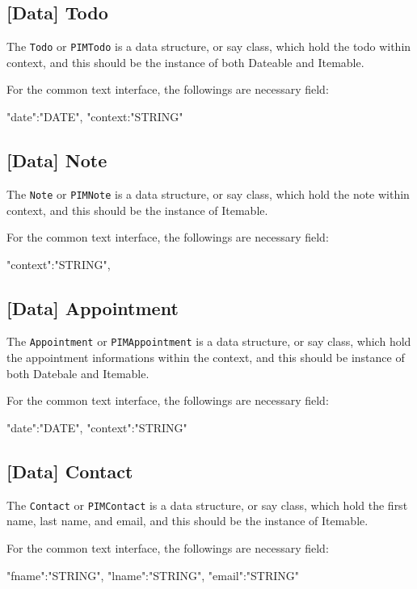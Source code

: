 \documentclass{article}
\begin{document}
    \subsection{[Data] Todo}
    The \lstinline|Todo| or \lstinline|PIMTodo| is a data structure, or say class, which hold the todo within context,
    and this should be the instance of both Dateable and Itemable.
    
    For the common text interface, the followings are necessary field: 
    \begin{json}
 {
     "date":"{DATE}",
     "context:"{STRING}"
 }
    \end{json} 
    
    \subsection{[Data] Note}
    The \lstinline|Note| or \lstinline|PIMNote| is a data structure, or say class, which hold the note within context,
    and this should be the instance of Itemable.
    
    For the common text interface, the followings are necessary field: 
    \begin{json}
 {
     "context":"{STRING}",
 }
    \end{json}
    
    \subsection{[Data] Appointment}
    The \lstinline|Appointment| or \lstinline|PIMAppointment| is a data structure, or say class,
    which hold the appointment informations within the context, and this should be instance of both Datebale and Itemable.
    
    For the common text interface, the followings are necessary field: 
    \begin{json}
 {
     "date":"{DATE}",
     "context":"{STRING}"
 }
    \end{json}
    
    \subsection{[Data] Contact}
    The \lstinline|Contact| or \lstinline|PIMContact| is a data structure, or say class, which hold the first name, last name,
    and email, and this should be the instance of Itemable.
    
    For the common text interface, the followings are necessary field: 
    \begin{json}
 {
     "fname":"{STRING}",
     "lname":"{STRING}",
     "email":"{STRING}"
 }
    \end{json}
    
\end{document}
